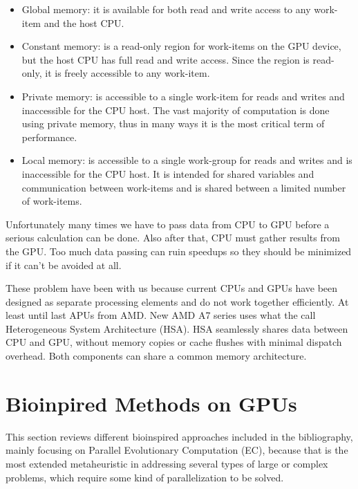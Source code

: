 \documentclass{comjnl}
\begin{document}
\begin{itemize}
\item Global memory: it is available for both read and write access to any work-item and the host CPU.
\item Constant memory: is a read-only region for work-items on the GPU device, but the host CPU has full read and write access. Since the region is read-only, it is freely accessible to any work-item.
\item Private memory: is accessible to a single work-item for reads and writes and inaccessible for the CPU host. The vast majority of computation is done using private memory, thus in many ways it is the most critical term of performance.
\item Local memory: is accessible to a single work-group for reads and writes and is inaccessible for the CPU host. It is intended for shared variables and communication between work-items and is shared between a limited number of work-items.
\end{itemize} 

Unfortunately many times we have to pass data from CPU to GPU before a serious calculation can be done. Also after that, CPU must gather results from the GPU. Too much data passing can ruin speedups so they should be minimized if it can't be avoided at all.

These problem have been with us because current CPUs and GPUs have been designed as separate processing elements and do not work together efficiently. At least until last APUs from AMD. New AMD A7 series uses what the call Heterogeneous System Architecture (HSA). HSA seamlessly shares data between CPU and GPU, without memory copies or cache flushes with minimal dispatch overhead. Both components can share a common memory architecture.

\section{Bioinpired Methods on GPUs}
\label{sec:bioinfor_apps}

This section reviews different bioinspired approaches included in the bibliography, mainly focusing on Parallel Evolutionary Computation (EC), because that is the most extended metaheuristic in addressing several types of large or complex problems, which require some kind of parallelization to be solved.
\end{document}
